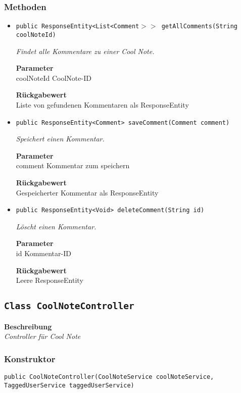     \subsubsection{Methoden}
    \begin{itemize}
    	\item{\texttt{public ResponseEntity<List<Comment$>>$ getAllComments(String coolNoteId)}}
    	
    	\textit{Findet alle Kommentare zu einer Cool Note.}
    	
    	\textbf{Parameter} \\
    	coolNoteId CoolNote-ID
    	
    	\textbf{Rückgabewert} \\
    	Liste von gefundenen Kommentaren als ResponseEntity        \item{\texttt{public ResponseEntity<Comment> saveComment(Comment comment)}}
    	
    	\textit{Speichert einen Kommentar.}
    	
    	\textbf{Parameter} \\
    	comment Kommentar zum speichern
    	
    	\textbf{Rückgabewert} \\
    	Gespeicherter Kommentar als ResponseEntity        \item{\texttt{public ResponseEntity<Void> deleteComment(String id)}}
    	
    	\textit{Löscht einen Kommentar.}
    	
    	\textbf{Parameter} \\
    	id Kommentar-ID
    	
    	\textbf{Rückgabewert} \\
    	Leere ResponseEntity
    \end{itemize}
    \subsection{\texttt{Class CoolNoteController}}
    \textbf{Beschreibung} \\
    \textit{Controller für Cool Note}
    \subsubsection{Konstruktor}
    \texttt{public CoolNoteController(CoolNoteService coolNoteService, TaggedUserService taggedUserService)}
